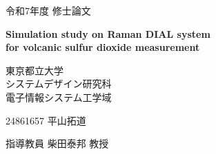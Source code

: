 \begin{titlepage}
\begin{center}
    \Large{令和7年度 修士論文}

    \vspace{7\zw}

    \huge{}

    \vspace{1\zw}

    \Large{\bfseries
        Simulation study on Raman DIAL system\\
        for volcanic sulfur dioxide measurement
    }

    \vspace{3\zw}

    \Large{
        東京都立大学\\
        システムデザイン研究科\\
        電子情報システム工学域
    }

    \vspace{3\zw}

    \Large{24861657 平山拓道}

    \vspace{1\zw}

    \Large{指導教員 柴田泰邦 教授}
\end{center}
\end{titlepage}
